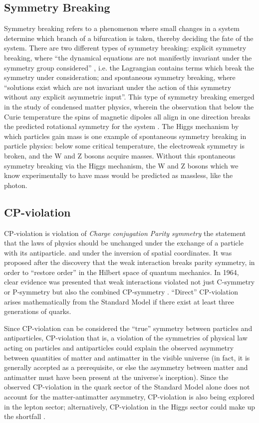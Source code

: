 \subsection{Symmetry Breaking}
Symmetry breaking refers to a phenomenon where small changes in a system determine which branch of a bifurcation is taken, thereby deciding the fate of the system. There are two different types of symmetry breaking: explicit symmetry breaking, where ``the dynamical equations are not manifestly invariant under the symmetry group considered'' \cite{Brading:2013:Symmetry}, i.e. the Lagrangian contains terms which break the symmetry under consideration; and spontaneous symmetry breaking, where ``solutions exist which are not invariant under the action of this symmetry without any explicit asymmetric input''. This type of symmetry breaking emerged in the study of condensed matter physics, wherein the observation that below the Curie temperature the spins of magnetic dipoles all align in one direction breaks the predicted rotational symmetry for the system \cite{Brading:2013:Symmetry}. The Higgs mechanism by which particles gain mass is one example of spontaneous symmetry breaking in particle physics: below some critical temperature, the electroweak symmetry is broken, and the W and Z bosons acquire masses. Without this spontaneous symmetry breaking via the Higgs mechanism, the W and Z bosons \textendash which we know experimentally to have mass \textendash would be predicted as massless, like the photon. \cite{Fermi:Electroweak}

\subsection{CP-violation}
CP-violation is violation of \emph{Charge conjugation Parity symmetry} \textendash the statement that the laws of physics should be unchanged under the exchange of a particle with its antiparticle. and under the inversion of spatial coordinates. It was proposed after the discovery that the weak interaction breaks parity symmetry, in order to ``restore order'' in the Hilbert space of quantum mechanics. In 1964, clear evidence was presented that weak interactions violated not just C-symmetry or P-symmetry but also the combined CP-symmetry \cite{CroninFitch:CP}. ``Direct'' CP-violation arises mathematically from the Standard Model if there exist at least three generations of quarks.

Since CP-violation can be considered the ``true'' symmetry between particles and antiparticles, CP-violation \textendash that is, a violation of the symmetries of physical law acting on particles and antiparticles \textendash could explain the observed asymmetry between quantities of matter and antimatter in the visible universe (in fact, it is generally accepted as a prerequisite, or else the asymmetry between matter and antimatter must have been present at the universe's inception). Since the observed CP-violation in the quark sector of the Standard Model alone does not account for the matter-antimatter asymmetry, CP-violation is also being explored in the lepton sector; alternatively, CP-violation in the Higgs sector could make up the shortfall \cite{LHC:CP:Higgs}.

